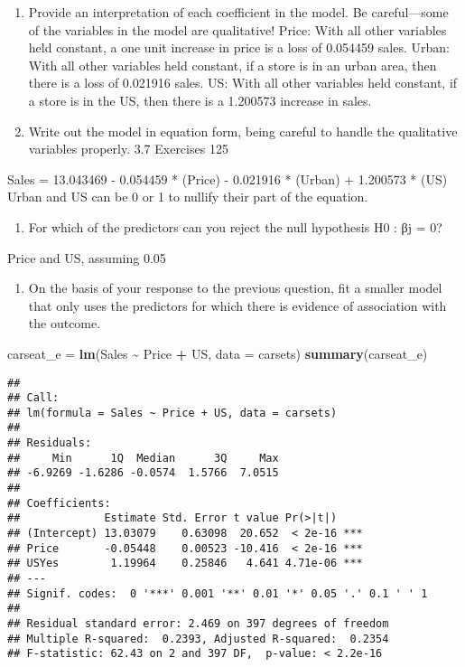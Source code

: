 \documentclass[
]{article}
\newenvironment{Shaded}{\begin{snugshade}}{\end{snugshade}}
\newcommand{\AttributeTok}[1]{\textcolor[rgb]{0.13,0.29,0.53}{#1}}
\newcommand{\FunctionTok}[1]{\textcolor[rgb]{0.13,0.29,0.53}{\textbf{#1}}}
\newcommand{\NormalTok}[1]{#1}
\newcommand{\OtherTok}[1]{\textcolor[rgb]{0.56,0.35,0.01}{#1}}
\newcommand{\SpecialCharTok}[1]{\textcolor[rgb]{0.81,0.36,0.00}{\textbf{#1}}}
\providecommand{\tightlist}{%
  \setlength{\itemsep}{0pt}\setlength{\parskip}{0pt}}
\begin{document}
\begin{enumerate}
\def\labelenumi{(\alph{enumi})}
\setcounter{enumi}{1}
\item
  Provide an interpretation of each coefficient in the model. Be
  careful---some of the variables in the model are qualitative! Price:
  With all other variables held constant, a one unit increase in price
  is a loss of 0.054459 sales. Urban: With all other variables held
  constant, if a store is in an urban area, then there is a loss of
  0.021916 sales. US: With all other variables held constant, if a store
  is in the US, then there is a 1.200573 increase in sales.
\item
  Write out the model in equation form, being careful to handle the
  qualitative variables properly. 3.7 Exercises 125
\end{enumerate}

Sales = 13.043469 - 0.054459 * (Price) - 0.021916 * (Urban) + 1.200573 *
(US) Urban and US can be 0 or 1 to nullify their part of the equation.

\begin{enumerate}
\def\labelenumi{(\alph{enumi})}
\setcounter{enumi}{3}
\tightlist
\item
  For which of the predictors can you reject the null hypothesis H0 : βj
  = 0?
\end{enumerate}

Price and US, assuming 0.05

\begin{enumerate}
\def\labelenumi{(\alph{enumi})}
\setcounter{enumi}{4}
\tightlist
\item
  On the basis of your response to the previous question, fit a smaller
  model that only uses the predictors for which there is evidence of
  association with the outcome.
\end{enumerate}

\begin{Shaded}
\begin{Highlighting}[]
\NormalTok{carseat\_e }\OtherTok{=} \FunctionTok{lm}\NormalTok{(Sales }\SpecialCharTok{\textasciitilde{}}\NormalTok{ Price }\SpecialCharTok{+}\NormalTok{ US, }\AttributeTok{data =}\NormalTok{ carsets)}
\FunctionTok{summary}\NormalTok{(carseat\_e)}
\end{Highlighting}
\end{Shaded}

\begin{verbatim}
## 
## Call:
## lm(formula = Sales ~ Price + US, data = carsets)
## 
## Residuals:
##     Min      1Q  Median      3Q     Max 
## -6.9269 -1.6286 -0.0574  1.5766  7.0515 
## 
## Coefficients:
##             Estimate Std. Error t value Pr(>|t|)    
## (Intercept) 13.03079    0.63098  20.652  < 2e-16 ***
## Price       -0.05448    0.00523 -10.416  < 2e-16 ***
## USYes        1.19964    0.25846   4.641 4.71e-06 ***
## ---
## Signif. codes:  0 '***' 0.001 '**' 0.01 '*' 0.05 '.' 0.1 ' ' 1
## 
## Residual standard error: 2.469 on 397 degrees of freedom
## Multiple R-squared:  0.2393, Adjusted R-squared:  0.2354 
## F-statistic: 62.43 on 2 and 397 DF,  p-value: < 2.2e-16
\end{verbatim}
\end{document}
